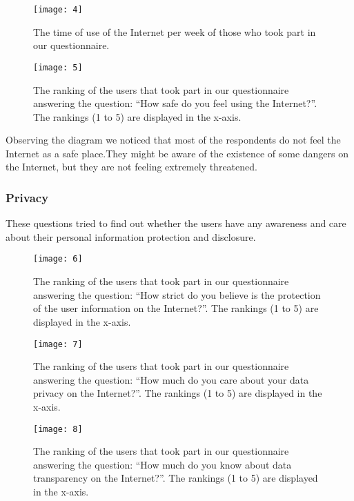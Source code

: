 \begin{figure}[H]
\centering
\texttt{[image: 4]}
\caption{The time of use of the Internet per week of those who took part in our 
questionnaire.}
\end{figure}

\begin{figure}[H]
\centering
\texttt{[image: 5]}
\caption{The ranking of the users that took part in our questionnaire answering 
the question: ``How safe do you feel using the Internet?''. The rankings (1 to 5) 
are displayed in the x-axis.}
\end{figure}

Observing the diagram we noticed that most of the respondents  do not feel the 
Internet as a safe place.They might be  aware of the existence of some dangers 
on the Internet, but they are not feeling extremely threatened.

\subsubsection{Privacy}

These questions tried to find out whether the users have any awareness and care 
about their personal information protection and disclosure.

\begin{figure}[H]
\centering
\texttt{[image: 6]}
\caption{The ranking of the users that took part in our questionnaire answering
the question: ``How strict do you believe is the protection of the user 
information on the Internet?''. The rankings (1 to 5) are displayed in the 
x-axis.}
\end{figure}

\begin{figure}[H]
\centering
\texttt{[image: 7]}
\caption{The ranking of the users that took part in our questionnaire answering
the question: ``How much do you care about your data privacy on the Internet?''. 
The rankings (1 to 5) are displayed in the x-axis.}
\end{figure}

\begin{figure}[H]
\centering
\texttt{[image: 8]}
\caption{The ranking of the users that took part in our questionnaire answering
the question: ``How much do you know about data transparency on the Internet?''. 
The rankings (1 to 5) are displayed in the x-axis.}
\end{figure}

